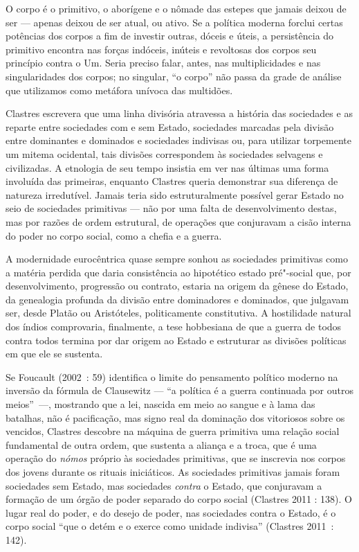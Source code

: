 O corpo é o primitivo, o aborígene e o nômade das estepes que jamais
deixou de ser --- apenas deixou de ser atual, ou ativo. Se a política
moderna forclui certas potências dos corpos a fim de investir outras,
dóceis e úteis, a persistência do primitivo encontra nas forças
indóceis, inúteis e revoltosas dos corpos seu princípio contra o Um.
Seria preciso falar, antes, nas multiplicidades e nas singularidades dos
corpos; no singular, ``o corpo'' não passa da grade de análise que
utilizamos como metáfora unívoca das multidões.

Clastres escrevera que uma linha divisória atravessa a história das
sociedades e as reparte entre sociedades com e sem Estado, sociedades
marcadas pela divisão entre dominantes e dominados e sociedades
indivisas ou, para utilizar torpemente um mitema ocidental, tais
divisões correspondem às sociedades selvagens e civilizadas. A etnologia
de seu tempo insistia em ver nas últimas uma forma involuída das
primeiras, enquanto Clastres queria demonstrar sua diferença de natureza
irredutível. Jamais teria sido estruturalmente possível gerar Estado no
seio de sociedades primitivas --- não por uma falta de desenvolvimento
destas, mas por razões de ordem estrutural, de operações que conjuravam
a cisão interna do poder no corpo social, como a chefia e a guerra.

A modernidade eurocêntrica quase sempre sonhou as sociedades primitivas
como a matéria perdida que daria consistência ao hipotético estado
pré"-social que, por desenvolvimento, progressão ou contrato, estaria na
origem da gênese do Estado, da genealogia profunda da divisão entre
dominadores e dominados, que julgavam ser, desde Platão ou Aristóteles,
politicamente constitutiva. A hostilidade natural dos índios
comprovaria, finalmente, a tese hobbesiana de que a guerra de todos
contra todos termina por dar origem ao Estado e estruturar as divisões
políticas em que ele se sustenta.

Se Foucault (2002~: 59) identifica o limite do pensamento político
moderno na inversão da fórmula de Clausewitz --- ``a política é a guerra
continuada por outros meios''~---, mostrando que a lei, nascida em meio
ao sangue e à lama das batalhas, não é pacificação, mas signo real da
dominação dos vitoriosos sobre os vencidos, Clastres descobre na máquina
de guerra primitiva uma relação social fundamental de outra ordem, que
sustenta a aliança e a troca, que é uma operação do \emph{nómos }próprio
às sociedades primitivas, que se inscrevia nos corpos dos jovens durante
os rituais iniciáticos. As sociedades primitivas jamais foram sociedades
sem Estado, mas sociedades \emph{contra }o Estado, que conjuravam a
formação de um órgão de poder separado do corpo social (Clastres 2011 :
138). O lugar real do poder, e do desejo de poder, nas sociedades contra
o Estado, é o corpo social ``que o detém e o exerce como unidade
indivisa'' (Clastres 2011~: 142).

